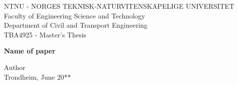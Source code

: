 \begin{titlepage}
\vspace * {-2.5cm}	
	NTNU - NORGES TEKNISK-NATURVITENSKAPELIGE UNIVERSITET\\
	Faculty of Engineering Science and Technology\\
	Department of Civil and Transport Engineering\\
	TBA4925 - Master's Thesis
	
\begin{center}

\vspace * {5cm}
\huge \textbf{Name of paper}

%
%


\vspace * {2cm}

\large
Author\\ Trondheim, June 20**
\end{center}

\end{titlepage}